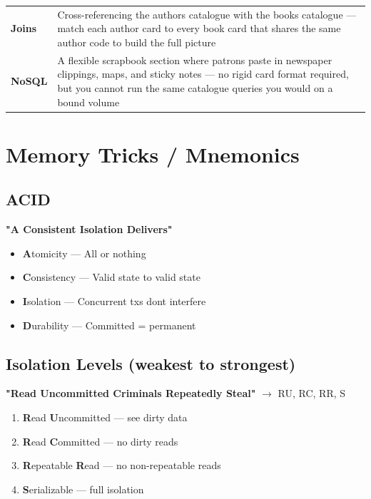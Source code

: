 \documentclass[11pt]{article}
\providecommand{\tightlist}{\setlength{\itemsep}{1pt}\setlength{\parskip}{0pt}}
\begin{document}
\begin{longtable}[]{@{}
  >{\raggedright\arraybackslash}p{}
  >{\raggedright\arraybackslash}p{}@{}}
\rowcolor{zebra}
\textbf{Joins} & Cross-referencing the authors\textquotesingle{} catalogue with the books\textquotesingle{} catalogue --- match each author card to every book card that shares the same author code to build the full picture \\
\textbf{NoSQL} & A flexible scrapbook section where patrons paste in newspaper clippings, maps, and sticky notes --- no rigid card format required, but you cannot run the same catalogue queries you would on a bound volume \\
\end{longtable}

\section{Memory Tricks / Mnemonics}\label{memory-tricks--mnemonics}

\subsection{ACID}\label{acid}

\textbf{"A Consistent Isolation Delivers"}

\begin{itemize}
\tightlist
\item
  \textbf{A}tomicity --- All or nothing
\item
  \textbf{C}onsistency --- Valid state to valid state
\item
  \textbf{I}solation --- Concurrent txs don\textquotesingle t interfere
\item
  \textbf{D}urability --- Committed = permanent
\end{itemize}

\subsection{Isolation Levels (weakest to strongest)}\label{isolation-levels-weakest-to-strongest}

\textbf{"Read Uncommitted Criminals Repeatedly Steal"} \(\rightarrow\) RU, RC, RR, S

\begin{enumerate}
\def\labelenumi{\arabic{enumi}.}
\tightlist
\item
  \textbf{R}ead \textbf{U}ncommitted --- see dirty data
\item
  \textbf{R}ead \textbf{C}ommitted --- no dirty reads
\item
  \textbf{R}epeatable \textbf{R}ead --- no non-repeatable reads
\item
  \textbf{S}erializable --- full isolation
\end{enumerate}
\end{document}
